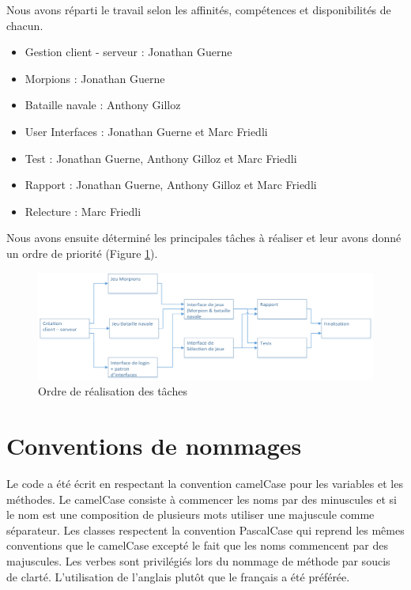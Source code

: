 \documentclass{report}
\begin{document}
Nous avons réparti le travail selon les affinités, compétences et disponibilités de chacun.
\par
\begin{itemize}
	\item Gestion client - serveur : Jonathan Guerne
	\item Morpions : Jonathan Guerne
	\item Bataille navale : Anthony Gilloz
	\item User Interfaces : Jonathan Guerne et Marc Friedli
	\item Test : Jonathan Guerne, Anthony Gilloz et Marc Friedli
	\item Rapport : Jonathan Guerne, Anthony Gilloz et Marc Friedli
	\item Relecture : Marc Friedli
\end{itemize}
\par
Nous avons ensuite déterminé les principales tâches à réaliser et leur avons donné un ordre de priorité (Figure \ref{planif}).

\begin{figure}[H]
	\centering\includegraphics[width=15cm]{Planif}
	\caption{Ordre de réalisation des tâches}
	\label{planif}
\end{figure}

\chapter{Conventions de nommages}
Le code a été écrit en respectant la convention camelCase pour les variables et
les méthodes. Le camelCase consiste à commencer les noms par des minuscules et si
le nom est une composition de plusieurs mots utiliser une majuscule comme séparateur.
Les classes respectent la convention PascalCase qui reprend les mêmes conventions que
le camelCase excepté le fait que les noms commencent par des majuscules.
Les verbes sont privilégiés lors du nommage de méthode par soucis de clarté.
L’utilisation de l’anglais plutôt que le français a été préférée.
\end{document}

